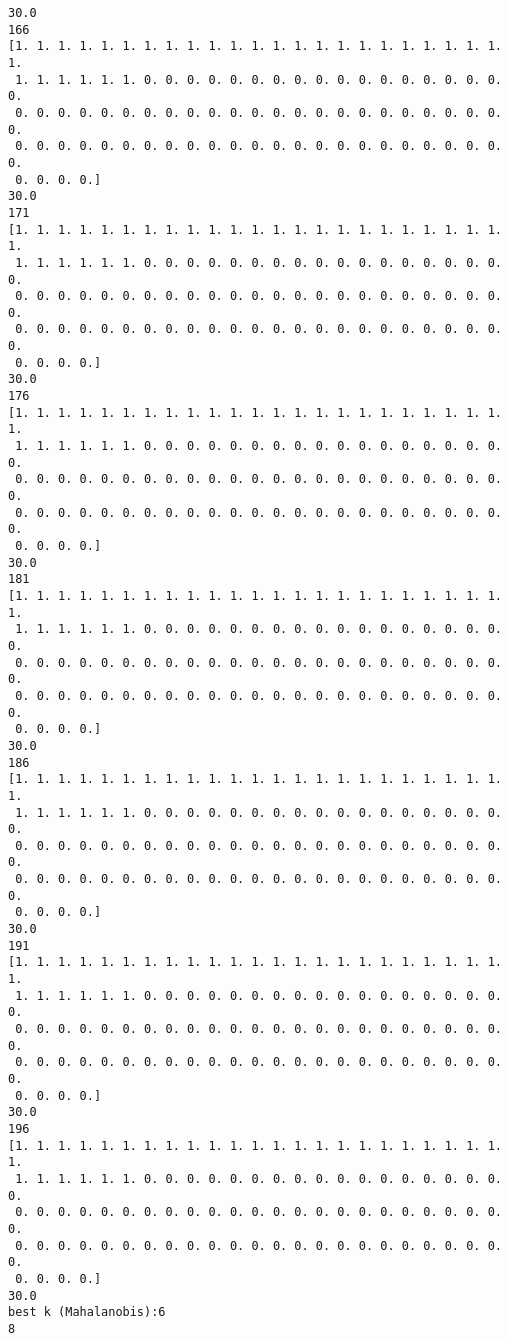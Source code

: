 \documentclass[11pt]{article}
\begin{document}
\begin{Verbatim}[commandchars=\\\{\}]
30.0
166
[1. 1. 1. 1. 1. 1. 1. 1. 1. 1. 1. 1. 1. 1. 1. 1. 1. 1. 1. 1. 1. 1. 1. 1.
 1. 1. 1. 1. 1. 1. 0. 0. 0. 0. 0. 0. 0. 0. 0. 0. 0. 0. 0. 0. 0. 0. 0. 0.
 0. 0. 0. 0. 0. 0. 0. 0. 0. 0. 0. 0. 0. 0. 0. 0. 0. 0. 0. 0. 0. 0. 0. 0.
 0. 0. 0. 0. 0. 0. 0. 0. 0. 0. 0. 0. 0. 0. 0. 0. 0. 0. 0. 0. 0. 0. 0. 0.
 0. 0. 0. 0.]
30.0
171
[1. 1. 1. 1. 1. 1. 1. 1. 1. 1. 1. 1. 1. 1. 1. 1. 1. 1. 1. 1. 1. 1. 1. 1.
 1. 1. 1. 1. 1. 1. 0. 0. 0. 0. 0. 0. 0. 0. 0. 0. 0. 0. 0. 0. 0. 0. 0. 0.
 0. 0. 0. 0. 0. 0. 0. 0. 0. 0. 0. 0. 0. 0. 0. 0. 0. 0. 0. 0. 0. 0. 0. 0.
 0. 0. 0. 0. 0. 0. 0. 0. 0. 0. 0. 0. 0. 0. 0. 0. 0. 0. 0. 0. 0. 0. 0. 0.
 0. 0. 0. 0.]
30.0
176
[1. 1. 1. 1. 1. 1. 1. 1. 1. 1. 1. 1. 1. 1. 1. 1. 1. 1. 1. 1. 1. 1. 1. 1.
 1. 1. 1. 1. 1. 1. 0. 0. 0. 0. 0. 0. 0. 0. 0. 0. 0. 0. 0. 0. 0. 0. 0. 0.
 0. 0. 0. 0. 0. 0. 0. 0. 0. 0. 0. 0. 0. 0. 0. 0. 0. 0. 0. 0. 0. 0. 0. 0.
 0. 0. 0. 0. 0. 0. 0. 0. 0. 0. 0. 0. 0. 0. 0. 0. 0. 0. 0. 0. 0. 0. 0. 0.
 0. 0. 0. 0.]
30.0
181
[1. 1. 1. 1. 1. 1. 1. 1. 1. 1. 1. 1. 1. 1. 1. 1. 1. 1. 1. 1. 1. 1. 1. 1.
 1. 1. 1. 1. 1. 1. 0. 0. 0. 0. 0. 0. 0. 0. 0. 0. 0. 0. 0. 0. 0. 0. 0. 0.
 0. 0. 0. 0. 0. 0. 0. 0. 0. 0. 0. 0. 0. 0. 0. 0. 0. 0. 0. 0. 0. 0. 0. 0.
 0. 0. 0. 0. 0. 0. 0. 0. 0. 0. 0. 0. 0. 0. 0. 0. 0. 0. 0. 0. 0. 0. 0. 0.
 0. 0. 0. 0.]
30.0
186
[1. 1. 1. 1. 1. 1. 1. 1. 1. 1. 1. 1. 1. 1. 1. 1. 1. 1. 1. 1. 1. 1. 1. 1.
 1. 1. 1. 1. 1. 1. 0. 0. 0. 0. 0. 0. 0. 0. 0. 0. 0. 0. 0. 0. 0. 0. 0. 0.
 0. 0. 0. 0. 0. 0. 0. 0. 0. 0. 0. 0. 0. 0. 0. 0. 0. 0. 0. 0. 0. 0. 0. 0.
 0. 0. 0. 0. 0. 0. 0. 0. 0. 0. 0. 0. 0. 0. 0. 0. 0. 0. 0. 0. 0. 0. 0. 0.
 0. 0. 0. 0.]
30.0
191
[1. 1. 1. 1. 1. 1. 1. 1. 1. 1. 1. 1. 1. 1. 1. 1. 1. 1. 1. 1. 1. 1. 1. 1.
 1. 1. 1. 1. 1. 1. 0. 0. 0. 0. 0. 0. 0. 0. 0. 0. 0. 0. 0. 0. 0. 0. 0. 0.
 0. 0. 0. 0. 0. 0. 0. 0. 0. 0. 0. 0. 0. 0. 0. 0. 0. 0. 0. 0. 0. 0. 0. 0.
 0. 0. 0. 0. 0. 0. 0. 0. 0. 0. 0. 0. 0. 0. 0. 0. 0. 0. 0. 0. 0. 0. 0. 0.
 0. 0. 0. 0.]
30.0
196
[1. 1. 1. 1. 1. 1. 1. 1. 1. 1. 1. 1. 1. 1. 1. 1. 1. 1. 1. 1. 1. 1. 1. 1.
 1. 1. 1. 1. 1. 1. 0. 0. 0. 0. 0. 0. 0. 0. 0. 0. 0. 0. 0. 0. 0. 0. 0. 0.
 0. 0. 0. 0. 0. 0. 0. 0. 0. 0. 0. 0. 0. 0. 0. 0. 0. 0. 0. 0. 0. 0. 0. 0.
 0. 0. 0. 0. 0. 0. 0. 0. 0. 0. 0. 0. 0. 0. 0. 0. 0. 0. 0. 0. 0. 0. 0. 0.
 0. 0. 0. 0.]
30.0
best k (Mahalanobis):6
8

    \end{Verbatim}
\end{document}
